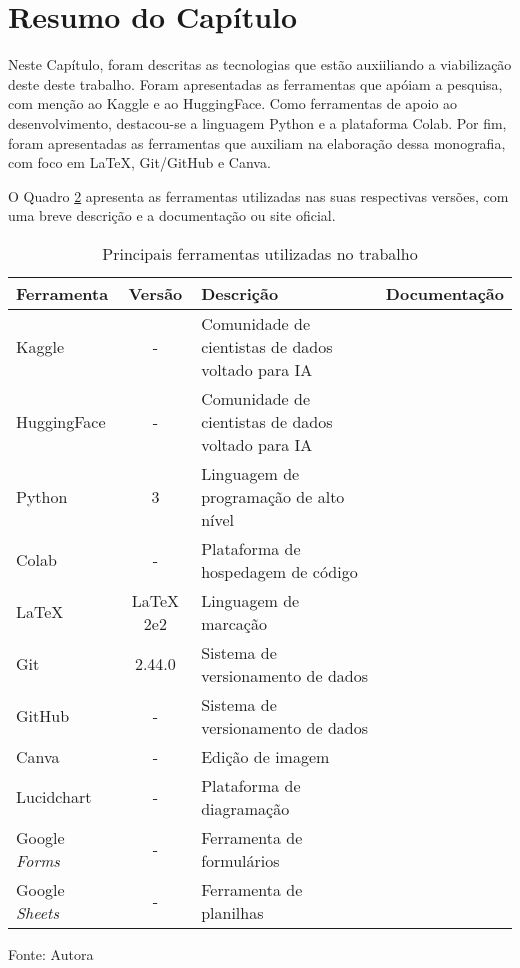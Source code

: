 \section{Resumo do Capítulo}\label{sec:resumosuptec}
Neste Capítulo, foram descritas as tecnologias que estão auxiiliando a viabilização deste deste trabalho. Foram apresentadas as 
ferramentas que apóiam a pesquisa, com menção ao Kaggle e ao HuggingFace. 
Como ferramentas de apoio ao desenvolvimento, destacou-se a linguagem Python e a plataforma Colab. 
Por fim, foram apresentadas as ferramentas que auxiliam na elaboração dessa monografia, com foco em LaTeX, Git/GitHub e Canva.

O Quadro \hyperref[tab:2]{2} apresenta as ferramentas utilizadas nas suas respectivas versões, com uma breve descrição e a documentação ou site 
oficial.

\begin{table}[htbp]
    \centering
    \begin{threeparttable}
        \caption{Principais ferramentas utilizadas no trabalho}
        \label{tab:2}
        \begin{tabular}{|>{\centering\arraybackslash}m{3cm} c m{5cm} c|}
        \hline
        Ferramenta & Versão & Descrição & Documentação \\
        \hline
        Kaggle & - & Comunidade de cientistas de dados voltado para IA & \cite{kagglesite} \\
        \hline 
        HuggingFace & - & Comunidade de cientistas de dados voltado para IA & \cite{huggingsite} \\
        \hline 
        Python & 3 & Linguagem de programação de alto nível & \cite{pythonsite} \\
        \hline 
        Colab & - & Plataforma de hospedagem de código & \cite{colabsite} \\
        \hline 
        LaTeX & LaTeX 2e2 & Linguagem de marcação & \cite{latexsite} \\
        \hline 
        Git & 2.44.0 & Sistema de versionamento de dados & \cite{gitsite} \\
        \hline 
        GitHub & - & Sistema de versionamento de dados & \cite{githubsite} \\
        \hline 
        Canva & - & Edição de imagem & \cite{canva} \\
        \hline 
        Lucidchart & - & Plataforma de diagramação & \cite{lucidchart} \\
        \hline 
        Google \textit{Forms} & - & Ferramenta de formulários  & \cite{forms} \\
        \hline 
        Google \textit{Sheets} & - & Ferramenta de planilhas  & \cite{sheets} \\
        \hline 
        \end{tabular}
        \begin{tablenotes}
            \small
            \centering
            \item Fonte: Autora
        \end{tablenotes}
    \end{threeparttable}
\end{table}

